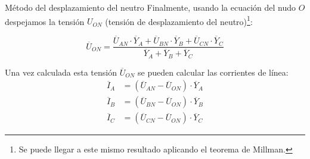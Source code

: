 \documentclass[aspectratio=169, usenames,svgnames,dvipsnames]{beamer}
\begin{document}
\begin{frame}[label={sec:org9119947}]{Método del desplazamiento del neutro}
Finalmente, usando la ecuación del nudo \(O\) despejamos la tensión \(U_{ON}\) (tensión de desplazamiento del neutro)\footnote{Se puede llegar a este mismo resultado aplicando el teorema de Millman.}:

\[
  \boxed{\overline{U}_{ON} = \frac{\overline{U}_{AN} \cdot \overline{Y}_A + \overline{U}_{BN} \cdot \overline{Y}_B + \overline{U}_{CN} \cdot \overline{Y}_C}{\overline{Y}_A + \overline{Y}_B + \overline{Y}_C}}
\]

Una vez calculada esta tensión \(\overline{U}_{ON}\) se pueden calcular las corrientes de línea:
\begin{align*}
  \overline{I}_A &= (\overline{U}_{AN} - \overline{U}_{ON})\cdot{\overline{Y}_A}\\
  \overline{I}_B &= (\overline{U}_{BN} - \overline{U}_{ON})\cdot{\overline{Y}_B}\\
  \overline{I}_C &= (\overline{U}_{CN} - \overline{U}_{ON})\cdot{\overline{Y}_C}
\end{align*}
\end{frame}
\end{document}
